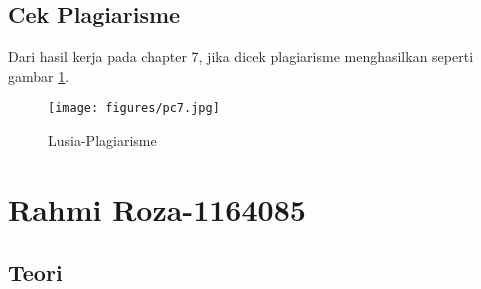 \subsection{Cek Plagiarisme}
\par Dari hasil kerja pada chapter 7, jika dicek plagiarisme menghasilkan seperti gambar \ref{7D1}.
		\begin{figure}[!hbtp]
		\centering
		\texttt{[image: figures/pc7.jpg]}
		\caption{Lusia-Plagiarisme}
		\label{7D1}
		\end{figure}




\section{Rahmi Roza-1164085}
\subsection{Teori}
